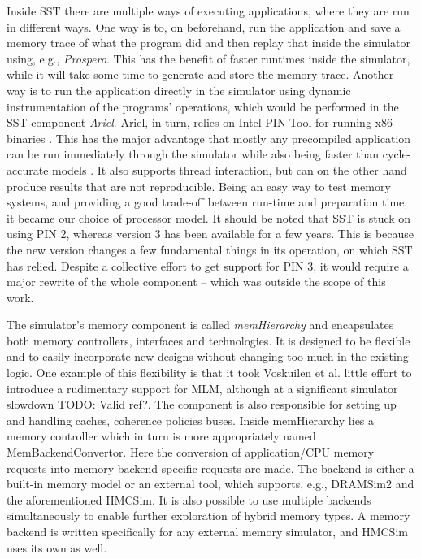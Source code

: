 Inside SST there are multiple ways of executing applications, where they are run in different ways. One way is to, on beforehand, run the application and save a memory trace of what the program did and then replay that inside the simulator using, e.g., \emph{Prospero}. This has the benefit of faster runtimes inside the simulator, while it will take some time to generate and store the memory trace. Another way is to run the application directly in the simulator using dynamic instrumentation of the programs' operations, which would be performed in the SST component \emph{Ariel}. Ariel, in turn, relies on Intel PIN Tool for running x86 binaries \cite{Luk:2005:PBC:1065010.1065034}. This has the major advantage that mostly any precompiled application can be run immediately through the simulator while also being faster than cycle-accurate models \cite{hammond2018structural}. It also supports thread interaction, but can on the other hand produce results that are not reproducible. Being an easy way to test memory systems, and providing a good trade-off between run-time and preparation time, it became our choice of processor model. It should be noted that SST is stuck on using PIN 2, whereas version 3 has been available for a few years. This is because the new version changes a few fundamental things in its operation, on which SST has relied. Despite a collective effort to get support for PIN 3, it would require a major rewrite of the whole component -- which was outside the scope of this work.
\bigskip

The simulator's memory component is called \emph{memHierarchy} and encapsulates both memory controllers, interfaces and technologies. It is designed to be flexible and to easily incorporate new designs without changing too much in the existing logic. One example of this flexibility is that it took Voskuilen et al. little effort to introduce a rudimentary support for MLM, although at a significant simulator slowdown \cite{voskuilen2018analyzing} TODO: Valid ref?. The component is also responsible for setting up and handling caches, coherence policies buses. Inside memHierarchy lies a memory controller which in turn is more appropriately named MemBackendConvertor. Here the conversion of application/CPU memory requests into memory backend specific requests are made. The backend is either a built-in memory model or an external tool, which supports, e.g., DRAMSim2 and the aforementioned HMCSim. It is also possible to use multiple backends simultaneously to enable further exploration of hybrid memory types. A memory backend is written specifically for any external memory simulator, and HMCSim uses its own as well.
\bigskip

